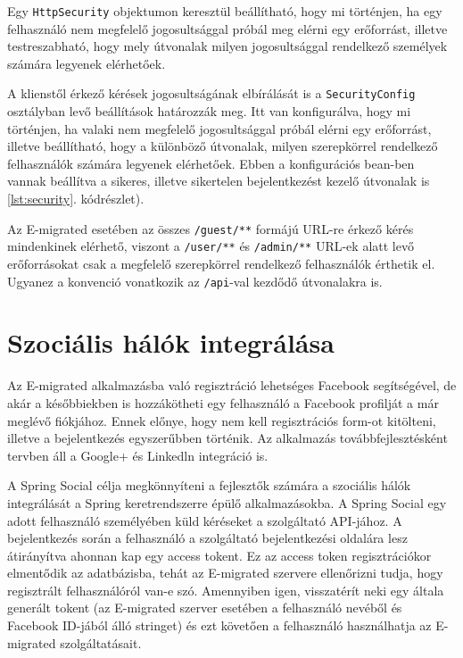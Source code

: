 \begin{listing}[!b]
  \inputminted[fontsize=\small]{java}{progfiles/security.java}
  \caption{Egy \texttt{HttpSecurity} objektumon keresztül beállítható, hogy mi történjen, ha egy felhasználó nem megfelelő jogosultsággal próbál meg elérni egy erőforrást, illetve testreszabható, hogy mely útvonalak milyen jogosultsággal rendelkező személyek számára legyenek elérhetőek.}
  \label{lst:security}
\end{listing}

A klienstől érkező kérések jogosultságának elbírálását is a \texttt{SecurityConfig} osztályban levő beállítások határozzák meg. Itt van konfigurálva, hogy mi történjen, ha valaki nem megfelelő jogosultsággal próbál elérni egy erőforrást, illetve beállítható, hogy a különböző útvonalak, milyen szerepkörrel rendelkező felhasználók számára legyenek elérhetőek. Ebben a konfigurációs bean-ben vannak beállítva a sikeres, illetve sikertelen bejelentkezést kezelő útvonalak is \ref{lst:security}. kódrészlet). 


Az E-migrated esetében az összes \texttt{/guest/**} formájú URL-re érkező kérés mindenkinek elérhető, viszont a \texttt{/user/**} és \texttt{/admin/**} URL-ek alatt levő erőforrásokat csak a megfelelő szerepkörrel rendelkező felhasználók érthetik el. Ugyanez a konvenció vonatkozik az \texttt{/api}-val kezdődő útvonalakra is.

\section{Szociális hálók integrálása}
\label{subsec:szocialisHalo}

Az E-migrated alkalmazásba való regisztráció lehetséges Facebook segítségével, de akár a későbbiekben is hozzákötheti egy felhasználó a Facebook profilját a már meglévő fiókjához. Ennek előnye, hogy nem kell regisztrációs form-ot kitölteni, illetve a bejelentkezés egyszerűbben történik. Az alkalmazás továbbfejlesztésként tervben áll a Google+ és Linkedln integráció is. 


A Spring Social \cite{SpringSocial} célja megkönnyíteni a fejlesztők számára a szociális hálók integrálását a Spring keretrendszerre épülő alkalmazásokba. A Spring Social egy adott felhasználó személyében küld kéréseket a szolgáltató API-jához. A bejelentkezés során a felhasználó a szolgáltató bejelentkezési oldalára lesz átirányítva ahonnan kap egy access tokent. Ez az access token regisztrációkor elmentődik az adatbázisba, tehát az E-migrated szervere ellenőrizni tudja, hogy regisztrált felhasználóról van-e szó. Amennyiben igen, visszatérít neki egy általa generált tokent (az E-migrated szerver esetében a felhasználó nevéből és Facebook ID-jából álló stringet) és ezt követően a felhasználó használhatja az E-migrated szolgáltatásait. 

